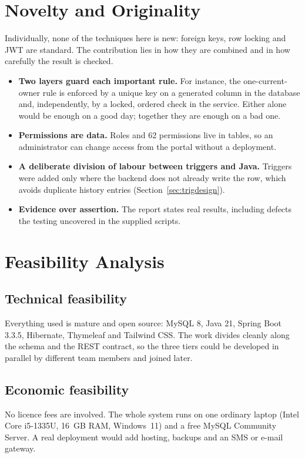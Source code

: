 \section{Novelty and Originality}
Individually, none of the techniques here is new: foreign keys, row locking and JWT
are standard. The contribution lies in how they are combined and in how carefully the
result is checked.
\begin{itemize}
\item \textbf{Two layers guard each important rule.} For instance, the one-current-owner rule is enforced by a unique key on a generated column in the database and, independently, by a locked, ordered check in the service. Either alone would be enough on a good day; together they are enough on a bad one.
\item \textbf{Permissions are data.} Roles and 62 permissions live in tables, so an administrator can change access from the portal without a deployment.
\item \textbf{A deliberate division of labour between triggers and Java.} Triggers were added only where the backend does not already write the row, which avoids duplicate history entries (Section~\ref{sec:trigdesign}).
\item \textbf{Evidence over assertion.} The report states real results, including defects the testing uncovered in the supplied scripts.
\end{itemize}

\section{Feasibility Analysis}
\subsection{Technical feasibility}
Everything used is mature and open source: MySQL 8, Java 21, Spring Boot 3.3.5,
Hibernate, Thymeleaf and Tailwind CSS. The work divides cleanly along the schema and the
REST contract, so the three tiers could be developed in parallel by different team
members and joined later.

\subsection{Economic feasibility}
No licence fees are involved. The whole system runs on one ordinary laptop (Intel Core
i5-1335U, 16~GB RAM, Windows~11) and a free MySQL Community Server. A real deployment
would add hosting, backups and an SMS or e-mail gateway.

